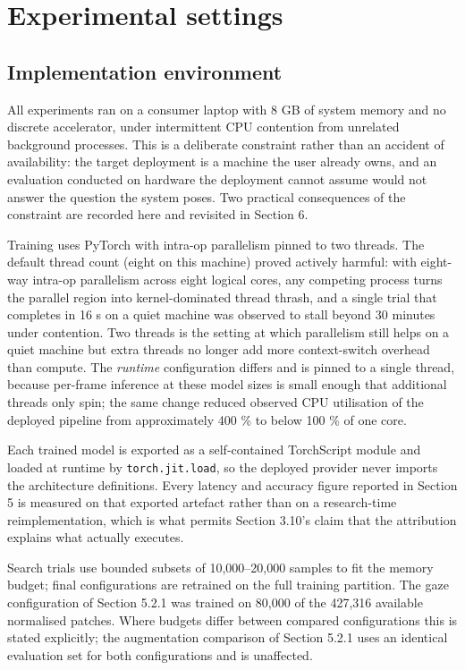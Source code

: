 \FloatBarrier

\section{Experimental settings}

\FloatBarrier

\subsection{Implementation environment}

All experiments ran on a consumer laptop with 8 GB of system memory and no discrete accelerator, under intermittent CPU contention from unrelated background processes. This is a deliberate constraint rather than an accident of availability: the target deployment is a machine the user already owns, and an evaluation conducted on hardware the deployment cannot assume would not answer the question the system poses. Two practical consequences of the constraint are recorded here and revisited in Section 6.

Training uses PyTorch  with intra-op parallelism pinned to two threads. The default thread count (eight on this machine) proved actively harmful: with eight-way intra-op parallelism across eight logical cores, any competing process turns the parallel region into kernel-dominated thread thrash, and a single trial that completes in 16 s on a quiet machine was observed to stall beyond 30 minutes under contention. Two threads is the setting at which parallelism still helps on a quiet machine but extra threads no longer add more context-switch overhead than compute. The \emph{runtime} configuration differs and is pinned to a single thread, because per-frame inference at these model sizes is small enough that additional threads only spin; the same change reduced observed CPU utilisation of the deployed pipeline from approximately 400 \% to below 100 \% of one core.

Each trained model is exported as a self-contained TorchScript module  and loaded at runtime by \texttt{torch.jit.load}, so the deployed provider never imports the architecture definitions. Every latency and accuracy figure reported in Section 5 is measured on that exported artefact rather than on a research-time reimplementation, which is what permits Section 3.10's claim that the attribution explains what actually executes.

Search trials use bounded subsets of 10,000--20,000 samples to fit the memory budget; final configurations are retrained on the full training partition. The gaze configuration of Section 5.2.1 was trained on 80,000 of the 427,316 available normalised patches. Where budgets differ between compared configurations this is stated explicitly; the augmentation comparison of Section 5.2.1 uses an identical evaluation set for both configurations and is unaffected.


